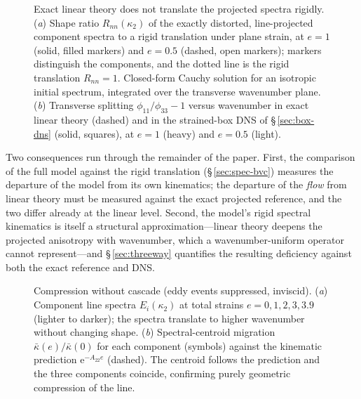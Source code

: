 \documentclass[11pt,a4paper]{article}
\begin{document}
\begin{figure}
  \centering
  \caption{Exact linear theory does not translate the projected spectra
  rigidly. (\textit{a}) Shape ratio $R_{nn}(\kappa_2)$ of the exactly
  distorted, line-projected component spectra to a rigid translation under
  plane strain, at $e=1$ (solid, filled markers) and $e=0.5$ (dashed, open
  markers); markers distinguish the components, and the dotted line is the
  rigid translation $R_{nn}=1$. Closed-form Cauchy solution for an
  isotropic initial spectrum, integrated over the transverse wavenumber
  plane. (\textit{b}) Transverse splitting $\phi_{11}/\phi_{33}-1$ versus
  wavenumber in exact linear theory (dashed) and in the strained-box DNS of
  \S\,\ref{sec:box-dns} (solid, squares), at $e=1$ (heavy) and $e=0.5$
  (light).}
  \label{fig:rdt-projection}
\end{figure}

Two consequences run through the remainder of the paper. First, the
comparison of the full model against the rigid translation
(\S\,\ref{sec:spec-bvc}) measures the departure of the model from its own
kinematics; the departure of the \emph{flow} from linear theory must be
measured against the exact projected reference, and the two differ already
at the linear level. Second, the model's rigid spectral kinematics is
itself a structural approximation---linear theory deepens the projected
anisotropy with wavenumber, which a wavenumber-uniform operator cannot
represent---and \S\,\ref{sec:threeway} quantifies the resulting deficiency
against both the exact reference and DNS.

\begin{figure}
  \centering
  \caption{Compression without cascade (eddy events suppressed, inviscid).
  (\textit{a}) Component line spectra $E_i(\kappa_2)$ at total strains
  $e=0,1,2,3,3.9$ (lighter to darker); the spectra translate to higher
  wavenumber without changing shape.
  (\textit{b}) Spectral-centroid migration $\bar\kappa(e)/\bar\kappa(0)$
  for each component (symbols) against the kinematic prediction
  $\mathrm{e}^{-A_{22}e}$ (dashed). The centroid follows the prediction
  and the three components coincide, confirming purely geometric
  compression of the line.}
  \label{fig:spec-rdt}
\end{figure}

\end{document}
